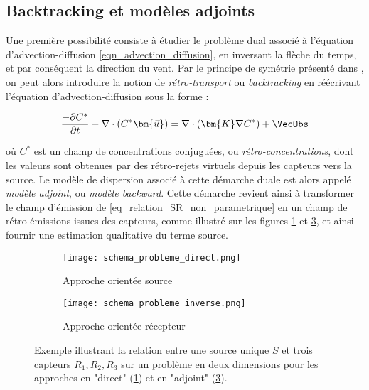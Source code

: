 	
 \subsection{Backtracking et modèles adjoints}
 
 Une première possibilité consiste à étudier le problème dual associé à l'équation d'advection-diffusion  \eqref{eqn_advection_diffusion}, en inversant la flèche du temps, et par conséquent la direction du vent.  Par le principe de symétrie présenté dans \cite{Hourdin2006a}, on peut alors introduire la notion de \textit{rétro-transport} ou \textit{backtracking} en  réécrivant l'équation d'advection-diffusion sous la forme : 
 
 \begin{equation}
 \label{eqn_advection_diffusion_backward}
 \dfrac{-\partial C^*}{\partial t} - \nabla \cdot(C^*\bm{\vec{u}}) = \nabla \cdot (\bm{K}\nabla C^*) + \VecObs
 \end{equation}
 
 où $C^*$ est un champ de concentrations conjuguées, ou \textit{rétro-concentrations}, dont les valeurs sont obtenues par des rétro-rejets virtuels depuis les capteurs vers la source. Le modèle de dispersion associé à cette démarche duale est alors appelé \textit{modèle adjoint}, ou \textit{modèle backward}. Cette démarche revient ainsi à transformer le champ d'émission de \eqref{eq_relation_SR_non_parametrique} en un champ de rétro-émissions issues des capteurs, comme illustré sur les figures \ref{schema_probleme_direct} et \ref{schema_probleme_inverse}, et ainsi fournir une estimation qualitative du terme source.\\
 
 \begin{figure}[h]
 	\begin{subfigure}{0.5\textwidth}
 		\texttt{[image: schema\_probleme\_direct.png]}
 		\caption{Approche orientée source}
 		\label{schema_probleme_direct}
 	\end{subfigure}
 	\begin{subfigure}{0.5\textwidth}
 		\texttt{[image: schema\_probleme\_inverse.png]}
 		\caption{Approche orientée récepteur}
 		\label{schema_probleme_inverse}
 	\end{subfigure}
 	\caption{Exemple illustrant la relation entre une source unique $S$ et trois capteurs $R_1,R_2,R_3$ sur un problème en deux dimensions pour les approches en "direct" (\ref{schema_probleme_direct}) et en "adjoint" (\ref{schema_probleme_inverse}). }
 \end{figure}
 
